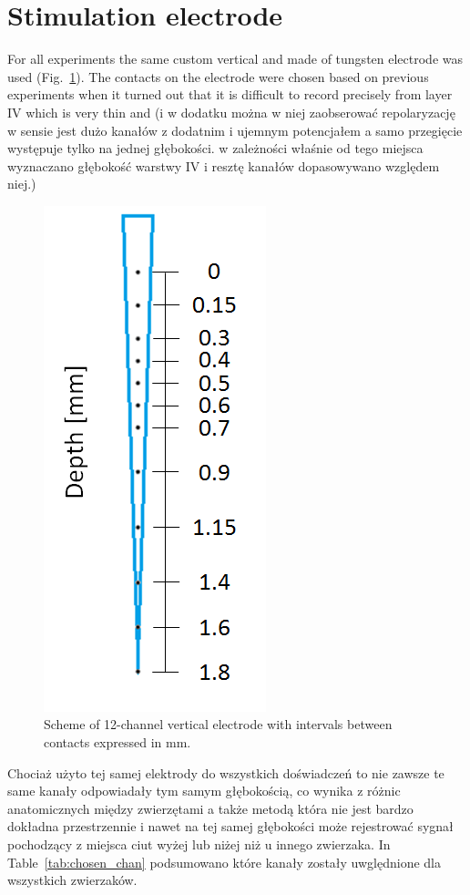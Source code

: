 \documentclass{pracalicmgr}
\begin{document}
 	\section{Stimulation electrode}
 	For all experiments the same custom vertical and made of tungsten electrode was used (Fig.~\ref{rys:electrode}). The contacts on the electrode were chosen based on previous experiments when it turned out that it is difficult to record precisely from layer IV which is very thin and 
 	(i w dodatku można w niej zaobserować repolaryzację w sensie jest dużo kanałów z dodatnim i ujemnym potencjałem a samo przegięcie występuje tylko na jednej głębokości. w zależności właśnie od tego miejsca wyznaczano głębokość warstwy IV i resztę kanałów dopasowywano względem niej.)
 	\begin{figure}[H]
 		\begin{center}
 			\includegraphics[scale=0.5]{electrode.png}
 		\end{center}
 		\caption{Scheme of 12-channel vertical electrode with intervals between contacts expressed in mm.}
 		\label{rys:electrode}
 	\end{figure} 
 	Chociaż użyto tej samej elektrody do wszystkich doświadczeń to nie zawsze te same kanały odpowiadały tym samym głębokością, co wynika z różnic anatomicznych między zwierzętami a także metodą która nie jest bardzo dokładna przestrzennie i nawet na tej samej głębokości może rejestrować sygnał pochodzący z miejsca ciut wyżej lub niżej niż u innego zwierzaka. In Table~\ref{tab:chosen_chan} podsumowano które kanały zostały uwględnione dla wszystkich zwierzaków.
\end{document}
